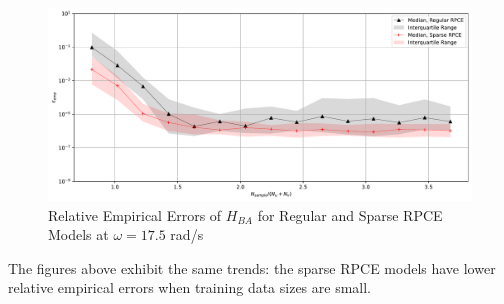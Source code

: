 \begin{figure}[H]
    \centering
    \includegraphics[width=1.0\textwidth]{
        plots/surrogate/plot_1_B_19.pdf
    }
    \caption{%
        Relative Empirical Errors of $H_{BA}$ for Regular and Sparse RPCE Models at $\omega=17.5$ rad/s
    }
    \label{FRF_sRPCE_B_A_19}
\end{figure}
The figures above exhibit the same trends: the sparse RPCE models have lower relative empirical errors when training data sizes are small.


